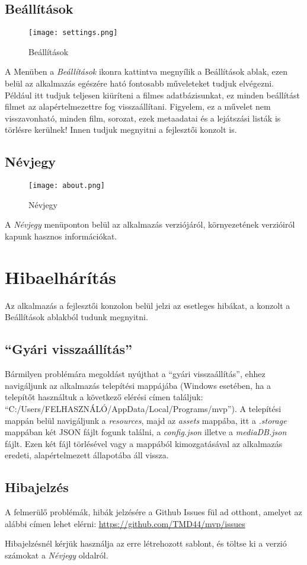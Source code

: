 \subsection{Beállítások}
\begin{figure}[H]
	\centering
	\texttt{[image: settings.png]}
	\caption{Beállítások}
	\label{fig:settings}
\end{figure}
A Menüben a {\it Beállítások} ikonra kattintva megnyílik a Beállítások ablak, ezen belül az alkalmazás egészére ható fontosabb műveleteket tudjuk elvégezni. Például itt tudjuk teljesen kiüríteni a filmes adatbázisunkat, ez minden beállítást filmet az alapértelmezettre fog visszaállítani. Figyelem, ez a művelet nem visszavonható, minden film, sorozat, ezek metaadatai és a lejátszási listák is törlésre kerülnek!
Innen tudjuk megnyitni a fejlesztői konzolt is.

\subsection{Névjegy}
\begin{figure}[H]
	\centering
	\texttt{[image: about.png]}
	\caption{Névjegy}
	\label{fig:about}
\end{figure}
A {\it Névjegy} menüponton belül az alkalmazás verziójáról, környezetének verzióiról kapunk hasznos információkat.

\section{Hibaelhárítás}
Az alkalmazás a fejlesztői konzolon belül jelzi az esetleges hibákat, a konzolt a Beállítások ablakból tudunk megnyitni.

\subsection{``Gyári visszaállítás''}
Bármilyen problémára megoldást nyújthat a ``gyári visszaállítás'', ehhez navigáljunk az alkalmazás telepítési mappájába (Windows esetében, ha a telepítőt használtuk a következő elérési címen találjuk: ``C:/Users/FELHASZNÁLÓ/AppData/Local/Programs/mvp''). A telepítési mappán belül navigáljunk a {\it resources}, majd az {\it assets} mappába, itt a {\it .storage} mappában két JSON fájlt fogunk találni, a {\it config.json} illetve a {\it mediaDB.json} fájlt. Ezen két fájl törlésével vagy a mappából kimozgatásával az alkalmazás eredeti, alapértelmezett állapotába áll vissza.

\subsection{Hibajelzés}
A felmerülő problémák, hibák jelzésére a Github Issues fül ad otthont, amelyet az alábbi címen lehet elérni: \url{https://github.com/TMD44/mvp/issues}

Hibajelzésnél kérjük használja az erre létrehozott sablont, és töltse ki a verzió számokat a {\it Névjegy} oldalról.
